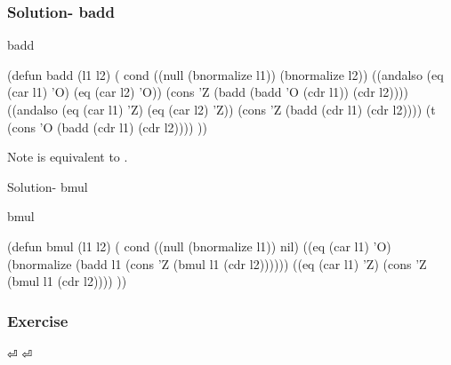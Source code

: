 \documentclass[fleqn]{beamer}
\begin{document}

\begin{frame}[fragile]
\frametitle{Solution- badd}
\begin{block}{badd}
  \begin{LISP}
(defun badd (l1 l2) (
  cond
    ((null (bnormalize l1)) (bnormalize l2))
    ((andalso (eq (car l1) 'O) (eq (car l2) 'O))
      (cons 'Z (badd (badd 'O (cdr l1)) (cdr l2))))
    ((andalso (eq (car l1) 'Z) (eq (car l2) 'Z))
      (cons 'Z (badd (cdr l1) (cdr l2))))
    (t (cons 'O (badd (cdr l1) (cdr l2))))
))
    \end{LISP}
\end{block}

\begin{block}{Note}
   is equivalent to .
\end{block}
\end{frame}


\begin{frame}[fragile]{Solution- bmul}
\begin{block}{bmul}
  \begin{LISP}
(defun bmul (l1 l2) (
  cond
    ((null (bnormalize l1)) nil)
    ((eq (car l1) 'O)
      (bnormalize
        (badd l1 (cons 'Z (bmul l1 (cdr l2))))))
    ((eq (car l1) 'Z) (cons 'Z (bmul l1 (cdr l2))))
))
    \end{LISP}
\end{block}
\end{frame}

\begin{frame}
\frametitle{Exercise}
⏎
⏎
\end{frame}
\end{document}
